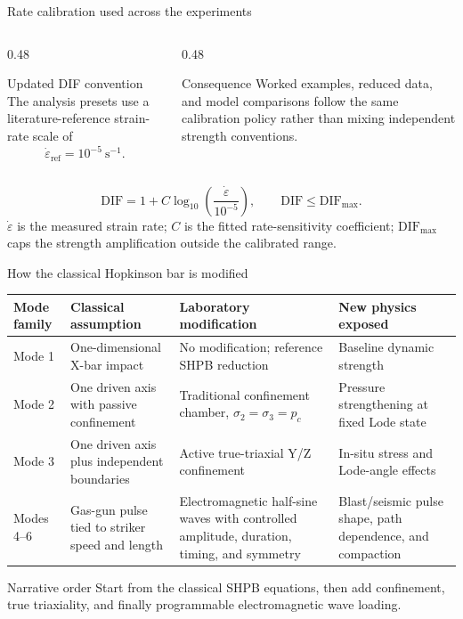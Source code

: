\documentclass[11pt,aspectratio=169]{beamer}
\newcommand{\toprule}{\hline}
\newcommand{\midrule}{\hline}
\newcommand{\bottomrule}{\hline}
\newcommand{\cncue}[1]{{\footnotesize\color{TUSTmidgray} #1}}
\begin{document}
\begin{frame}{Rate calibration used across the experiments}
  \small
  \begin{columns}[T,onlytextwidth]
    \begin{column}{0.48\textwidth}
      \begin{alertblock}{Updated DIF convention}
        The analysis presets use a literature-reference strain-rate scale of
        \[
          \dot{\varepsilon}_{\mathrm{ref}} = 10^{-5}\ \mathrm{s}^{-1}.
        \]
      \end{alertblock}
    \end{column}
    \begin{column}{0.48\textwidth}
      \begin{block}{Consequence}
        Worked examples, reduced data, and model comparisons follow the same
        calibration policy rather than mixing independent strength conventions.
      \end{block}
    \end{column}
  \end{columns}
  \vspace{0.2cm}
  \[
    \mathrm{DIF} = 1 + C\log_{10}\!\left(\frac{\dot{\varepsilon}}
    {10^{-5}}\right), \qquad \mathrm{DIF}\le \mathrm{DIF}_{\max}.
  \]
  \cncue{$\dot{\varepsilon}$ is the measured strain rate; $C$ is the fitted
  rate-sensitivity coefficient; $\mathrm{DIF}_{\max}$ caps the strength
  amplification outside the calibrated range.}
\end{frame}

\begin{frame}{How the classical Hopkinson bar is modified}
  \scriptsize
  \begin{tabular}{@{}p{}p{}p{}p{}@{}}
    \toprule
    \textbf{Mode family} & \textbf{Classical assumption} & \textbf{Laboratory modification} & \textbf{New physics exposed} \\
    \midrule
    Mode 1 & One-dimensional X-bar impact & No modification; reference SHPB reduction & Baseline dynamic strength \\
    Mode 2 & One driven axis with passive confinement & Traditional confinement chamber, $\sigma_2=\sigma_3=p_c$ & Pressure strengthening at fixed Lode state \\
    Mode 3 & One driven axis plus independent boundaries & Active true-triaxial Y/Z confinement & In-situ stress and Lode-angle effects \\
    Modes 4--6 & Gas-gun pulse tied to striker speed and length & Electromagnetic half-sine waves with controlled amplitude, duration, timing, and symmetry & Blast/seismic pulse shape, path dependence, and compaction \\
    \bottomrule
  \end{tabular}
  \vspace{0.25cm}
  \begin{block}{Narrative order}
    Start from the classical SHPB equations, then add confinement, true
    triaxiality, and finally programmable electromagnetic wave loading.
  \end{block}
\end{frame}
\end{document}
